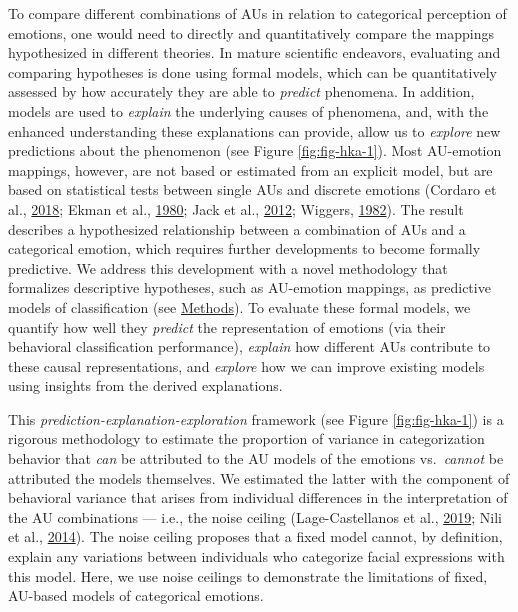 \documentclass[11pt,american,a4paper,oneside,]{memoir} %
\begin{document}
To compare different combinations of AUs in relation to categorical perception of emotions, one would need to directly and quantitatively compare the mappings hypothesized in different theories. In mature scientific endeavors, evaluating and comparing hypotheses is done using formal models, which can be quantitatively assessed by how accurately they are able to \emph{predict} phenomena. In addition, models are used to \emph{explain} the underlying causes of phenomena, and, with the enhanced understanding these explanations can provide, allow us to \emph{explore} new predictions about the phenomenon (see Figure \ref{fig:fig-hka-1}). Most AU-emotion mappings, however, are not based or estimated from an explicit model, but are based on statistical tests between single AUs and discrete emotions (Cordaro et al., \protect\hyperlink{ref-Cordaro2018-xm}{2018}; Ekman et al., \protect\hyperlink{ref-Ekman1980-of}{1980}; Jack et al., \protect\hyperlink{ref-Jack2012-eq}{2012}; Wiggers, \protect\hyperlink{ref-Wiggers1982-na}{1982}). The result describes a hypothesized relationship between a combination of AUs and a categorical emotion, which requires further developments to become formally predictive. We address this development with a novel methodology that formalizes descriptive hypotheses, such as AU-emotion mappings, as predictive models of classification (see \protect\hyperlink{hka-methods}{Methods}). To evaluate these formal models, we quantify how well they \emph{predict} the representation of emotions (via their behavioral classification performance), \emph{explain} how different AUs contribute to these causal representations, and \emph{explore} how we can improve existing models using insights from the derived explanations.

This \emph{prediction-explanation-exploration} framework (see Figure \ref{fig:fig-hka-1}) is a rigorous methodology to estimate the proportion of variance in categorization behavior that \emph{can} be attributed to the AU models of the emotions vs.~\emph{cannot} be attributed the models themselves. We estimated the latter with the component of behavioral variance that arises from individual differences in the interpretation of the AU combinations --- i.e., the noise ceiling (Lage-Castellanos et al., \protect\hyperlink{ref-lage2019methods}{2019}; Nili et al., \protect\hyperlink{ref-Nili2014-ar}{2014}). The noise ceiling proposes that a fixed model cannot, by definition, explain any variations between individuals who categorize facial expressions with this model. Here, we use noise ceilings to demonstrate the limitations of fixed, AU-based models of categorical emotions.
\end{document}
